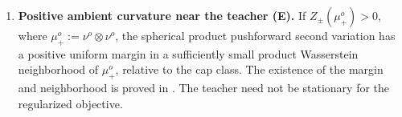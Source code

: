 \begin{proposition}
\begin{enumerate}[label=(\roman*),ref=(\roman*),leftmargin=*]
\item \label{item:mf-teacher-curvature}
\textbf{Positive ambient curvature near the teacher (E).}
If \(Z_\pm(\mu_+^o)>0\), where \(\mu_+^o:=\nu^o\otimes\nu^o\),
the spherical product pushforward second variation has a positive uniform
margin in a sufficiently
small product Wasserstein neighborhood of \(\mu_+^o\), relative to the cap class.
The existence of the margin and neighborhood is proved in
.
The teacher need not be stationary for the regularized objective.
\end{enumerate}
\end{proposition}
